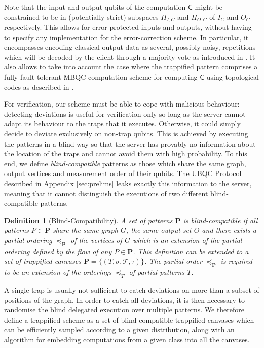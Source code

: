 \documentclass[12pt]{iopart}
\newcommand{\cptp}[1]{\mathsf{#1}} \newcommand{\pd}[1]{\mathcal{#1}}  \newcommand{\sch}[1]{\bm{#1}}
\renewcommand{\1}{\mathds{1}}
\newtheorem{definition}{Definition}
\begin{document}
Note that the input and output qubits of the computation $\cptp{C}$ might be constrained to be in (potentially strict) subspaces $\Pi_{I, C}$ and $\Pi_{O, C}$ of $I_C$ and $O_C$ respectively. This allows for error-protected inputs and outputs, without having to specify any implementation for the error-correction scheme.  In particular, it encompasses encoding classical output data as several, possibly noisy, repetitions which will be decoded by the client through a majority vote as introduced in \cite{LMKO21:verifying}.  It also allows to take into account the case where the trappified pattern comprises a fully fault-tolerant MBQC computation scheme for computing $\cptp C$ using topological codes as described in \cite{RHG07:topological}.

For verification, our scheme must be able to cope with malicious behaviour: detecting deviations is useful for verification only so long as the server cannot adapt its behaviour to the traps that it executes. Otherwise, it could simply decide to deviate exclusively on non-trap qubits. 
This is achieved by executing the patterns in a blind way so that the server has provably no information about the location of the traps and cannot avoid them with high probability. 
To this end, we define \emph{blind-compatible} patterns as those which share the same graph, output vertices and measurement order of their qubits. The UBQC Protocol described in Appendix \ref{sec:prelims} leaks exactly this information to the server, meaning that it cannot distinguish the executions of two different blind-compatible patterns.

\begin{definition}[Blind-Compatibility]
\label{def:compat}
A set of patterns $\sch P$ is \emph{blind-compatible} if all patterns $P \in \sch P$ share the same graph $G$, the same output set $O$ and there exists a partial ordering $\preceq_{\sch P}$ of the vertices of $G$ which is an extension of the partial ordering defined by the flow of any $P \in \sch P$. This definition can be extended to a set of trappified canvases $\sch P = \{(T, \sigma, \pd{T}, \tau)\}$. The partial order $\preceq_{\sch P}$ is required to be an extension of the orderings $\preceq_T$ of partial patterns $T$.
\end{definition}

A single trap is usually not sufficient to catch deviations on more than a subset of positions of the graph. In order to catch all deviations, it is then necessary to randomise the blind delegated execution over multiple patterns.
We therefore define a trappified scheme as a set of blind-compatible trappified canvases which can be efficiently sampled according to a given distribution, along with an algorithm for embedding computations from a given class into all the canvases.
\end{document}
